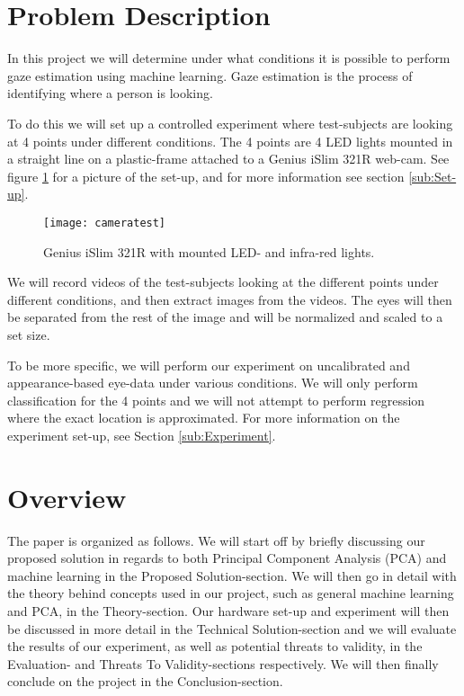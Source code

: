 \section{Problem Description}
In this project we will determine under what conditions it is possible to perform gaze estimation using machine learning.
Gaze estimation is the process of identifying where a person is looking.

To do this we will set up a controlled experiment where test-subjects are looking at 4 points under different conditions.
The 4 points are 4 LED lights mounted in a straight line on a plastic-frame attached to a Genius iSlim 321R web-cam.
See figure \ref{fig:webcamsetup} for a picture of the set-up, and for more information see section \ref{sub:Set-up}.

\begin{figure}[h!]
\centering
\texttt{[image: cameratest]}
\caption{Genius iSlim 321R with mounted LED- and infra-red lights.}
\label{fig:webcamsetup}
\end{figure}

We will record videos of the test-subjects looking at the different points under different conditions, and then extract images from the videos.
The eyes will then be separated from the rest of the image and will be normalized and scaled to a set size.

To be more specific, we will perform our experiment on uncalibrated and appearance-based eye-data under various conditions.
We will only perform classification for the 4 points and we will not attempt to perform regression \cite{hansen2010eye} where the exact location is approximated.
For more information on the experiment set-up, see Section \ref{sub:Experiment}.

\section{Overview}
The paper is organized as follows. We will start off by briefly discussing our proposed solution in regards to both Principal Component Analysis (PCA) and machine learning in the Proposed Solution-section.
We will then go in detail with the theory behind concepts used in our project, such as general machine learning and PCA, in the Theory-section. 
Our hardware set-up and experiment will then be discussed in more detail in the Technical Solution-section and we will evaluate the results of our experiment, as well as potential threats to validity, in the Evaluation- and Threats To Validity-sections respectively. 
We will then finally conclude on the project in the Conclusion-section.

